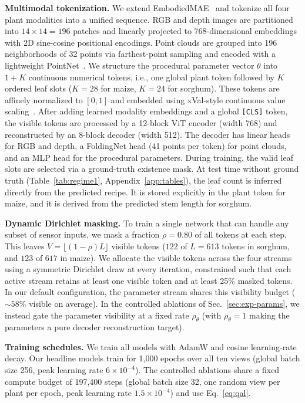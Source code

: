 \documentclass[10pt,twocolumn,letterpaper]{article}
\begin{document}
\noindent\textbf{Multimodal tokenization.}
We extend EmbodiedMAE~\citep{dong2025embodiedmae} and tokenize all four plant modalities into a unified sequence. RGB and depth images are partitioned into $14 \times 14 = 196$ patches and linearly projected to 768-dimensional embeddings with 2D sine-cosine positional encodings. Point clouds are grouped into 196 neighborhoods of 32 points via farthest-point sampling and encoded with a lightweight PointNet~\citep{pang2022pointmae,qi2017pointnet}. We structure the procedural parameter vector $\theta$ into $1 + K$ continuous numerical tokens, i.e., one global plant token followed by $K$ ordered leaf slots ($K = 28$ for maize, $K = 24$ for sorghum). These tokens are affinely normalized to $[0,1]$ and embedded using xVal-style continuous value scaling~\citep{golkar2023xval}. After adding learned modality embeddings and a global \texttt{[CLS]} token, the visible tokens are processed by a 12-block ViT encoder (width 768) and reconstructed by an 8-block decoder (width 512). The decoder has linear heads for RGB and depth, a FoldingNet head (41 points per token) for point clouds, and an MLP head for the procedural parameters. During training, the valid leaf slots are selected via a ground-truth existence mask. At test time without ground truth (Table~\ref{tab:regime1}, Appendix~\ref{app:tables}), the leaf count is inferred directly from the predicted recipe. It is stored explicitly in the plant token for maize, and it is derived from the predicted stem length for sorghum.

\noindent\textbf{Dynamic Dirichlet masking.}
To train a single network that can handle any subset of sensor inputs, we mask a fraction $\rho = 0.80$ of all tokens at each step. This leaves $V = \lfloor (1-\rho)L \rfloor$ visible tokens ($122$ of $L = 613$ tokens in sorghum, and $123$ of $617$ in maize). We allocate the visible tokens across the four streams using a symmetric Dirichlet draw at every iteration, constrained such that each active stream retains at least one visible token and at least 25\% masked tokens. In our default configuration, the parameter stream shares this visibility budget ($\sim 58\%$ visible on average). In the controlled ablations of Sec.~\ref{sec:exp-params}, we instead gate the parameter visibility at a fixed rate $\rho_\theta$ (with $\rho_\theta = 1$ making the parameters a pure decoder reconstruction target).

\noindent\textbf{Training schedules.}
We train all models with AdamW and cosine learning-rate decay. Our headline models train for 1{,}000 epochs over all ten views (global batch size 256, peak learning rate $6 \times 10^{-4}$). The controlled ablations share a fixed compute budget of 197{,}400 steps (global batch size 32, one random view per plant per epoch, peak learning rate $1.5 \times 10^{-4}$) and use Eq.~\eqref{eq:qal}.
\end{document}
